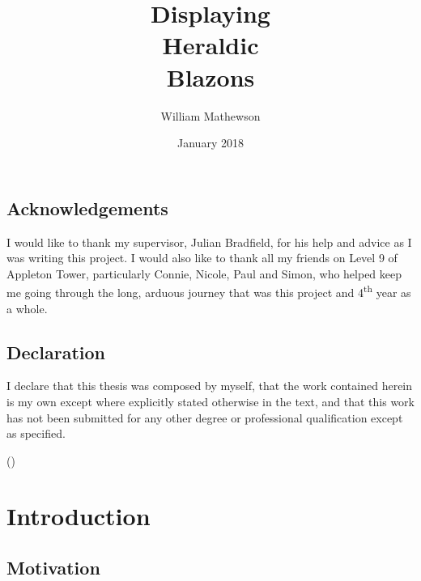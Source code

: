 \documentclass[nobib, a4paper, twoside, justified]{tufte-book}
\title{Displaying\\Heraldic\\Blazons}
\author{William Mathewson}
\date{January 2018}
\begin{document}
\frontmatter

\maketitlepage{}


\begin{publicationmeta}
  \section*{Acknowledgements}
  I would like to thank my supervisor, Julian Bradfield, for his help and advice as I was writing
  this project. I would also like to thank all my friends on Level 9 of Appleton Tower,
  particularly Connie, Nicole, Paul and Simon, who helped keep me going through the long, arduous
  journey that was this project and 4\textsuperscript{th} year as a whole.

  \section*{Declaration}
  I declare that this thesis was composed by myself,
  that the work contained herein is my own
  except where explicitly stated otherwise in the text,
  and that this work has not been submitted for any other degree or
  professional qualification except as specified.\par
  ({\textit{\thanklessauthor}})
\end{publicationmeta}

\tableofcontents


\mainmatter%

\chapter{Introduction}%
\label{cha:introduction}

\section{Motivation}\label{sec:motivation}
\end{document}
